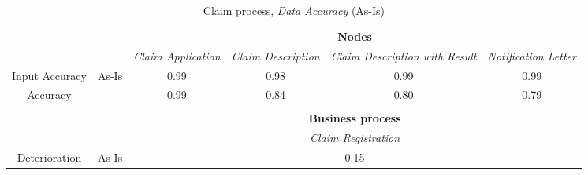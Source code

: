 \begin{center}
\begin{table}[H]
\begin{tabular}{|c|c|p{2cm}|p{2.5cm}|p{2.5cm}|p{2.5cm}|}


\cline{3-6}
\multicolumn{2}{c}{} & \multicolumn{4}{|c|}{\textbf{Nodes}} \\ \cline{3-6}
\multicolumn{2}{c|}{} & \textsl{Claim Application} & \textsl{Claim Description} & \textsl{Claim Description with Result} & \textsl{Notification Letter}\\
\hline
Input Accuracy & \multirow{2}{*}{As-Is} & \multicolumn{1}{c|}{0.99} & \multicolumn{1}{c|}{0.98} & \multicolumn{1}{c|}{0.99} & \multicolumn{1}{c|}{0.99}\\ \cline{1-1} \cline{3-6}

Accuracy	&	 & \multicolumn{1}{c|}{0.99} & \multicolumn{1}{c|}{0.84} & \multicolumn{1}{c|}{0.80} & \multicolumn{1}{c|}{0.79}\\ \hline

\multicolumn{6}{c}{} \\ \cline{3-6}
\multicolumn{2}{c}{} & \multicolumn{4}{|c|}{\textbf{Business process}} \\ \cline{3-6}
\multicolumn{2}{c|}{} & \multicolumn{4}{|c|}{\textsl{Claim Registration}} \\ \hline
Deterioration & As-Is & \multicolumn{4}{|c|}{0.15}\\ \hline
\end{tabular}
\caption{Claim process, \textsl{Data Accuracy} (As-Is)}
\label{tab:claim_as_is}
\end{table}
\end{center}